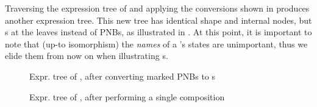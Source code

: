 Traversing the expression tree of  and applying the
conversions shown in  produces another
expression tree. This new tree has identical shape and internal nodes, but
\TNFA{}s at the leaves instead of PNBs, as illustrated in
. At this point, it is important to note that
(up-to isomorphism) the \emph{names} of a \TNFA{}'s states are unimportant,
thus we elide them from now on when illustrating \TNFA{}s.

\begin{figure}[ht]
    \centering
    \makeThreeCompTree{\usescalebox[0.75]\lendNoStateNFABox}
                      {\usescalebox[0.75]\bufferNoStateNFABox}
                      {\usescalebox[0.75]\rendNoStateNFABox}
\caption{Expr. tree of , after converting marked
PNBs to \TNFA{}s}
\label{fig:PNBExprTreeConverted}
\end{figure}

\begin{figure}[ht]
\centering
{}
\caption{Expr. tree of , after performing
a single \TNFA{} composition}
\label{fig:exprtreestep1}
\end{figure}

